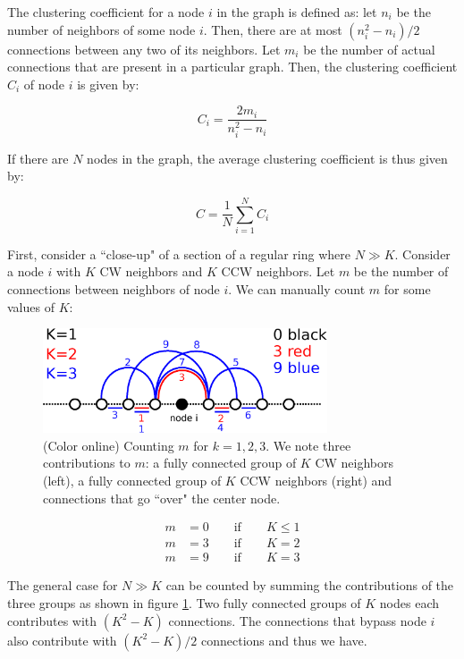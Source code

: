 \begin{apendicesenv}
The clustering coefficient for a node $i$ in the graph is defined as: let $n_i$ be the number of neighbors of some node $i$. Then,
there are at most $(n_i^2-n_i)/2$ connections between any two of its neighbors. Let $m_i$ be the number of actual connections that are
present in a particular graph. Then, the clustering coefficient $C_i$ of node $i$ is given by:

\begin{equation}
    C_i = \frac{2m_i}{n_i^2-n_i}
\end{equation}

\noindent If there are $N$ nodes in the graph, the average clustering
coefficient is thus given by:

\begin{equation}
    C = \frac{1}{N}\sum^N_{i=1} C_i
\end{equation}

First, consider a ``close-up" of a section of a regular ring where $N\gg K$.  Consider a node $i$ with $K$ CW neighbors and $K$ CCW
neighbors. Let $m$ be the number of connections between neighbors of node $i$. We can manually count $m$ for some values of $K$:

\begin{figure}
\centering
\includegraphics[width=0.75\textwidth]{fig/clustering.eps}
\caption{ (Color online) Counting $m$ for $k=1,2,3$. We note three contributions to $m$: a fully connected group of $K$ CW neighbors
(left), a fully connected group of $K$ CCW neighbors (right) and connections that go ``over" the center node.  }
\label{fig:clustering}
\end{figure}

\begin{align*}
    m &= 0 \qquad \text{if} \qquad K \leq 1\\
    m &= 3 \qquad \text{if} \qquad K = 2\\
    m &= 9 \qquad \text{if} \qquad K = 3
\end{align*}

The general case for $N \gg K$ can be counted by summing the contributions of the three groups as shown in figure \ref{fig:clustering}.
Two fully connected groups of $K$ nodes each contributes with $(K^2-K)$ connections. The connections that bypass node $i$ also
contribute with $(K^2-K)/2$ connections and thus we have.


\end{apendicesenv}
